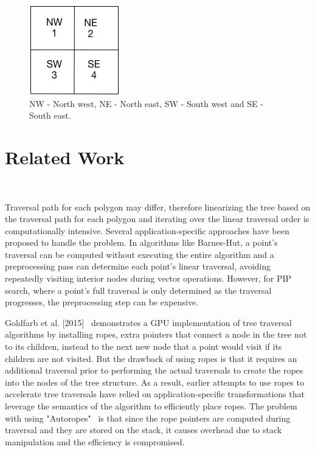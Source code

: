  \begin{figure}[H]    
 \centering
 \vspace{0.5in}
 \includegraphics[scale=0.8]{Images/Childquad}
 \vspace{0.5in}
 \caption{NW - North west, NE - North east, SW - South west and SE - South east.}
 \label{fig:Childquad}
 \end{figure}

\section{Related Work}~\label{sec:relatedWork}

Traversal path for each polygon may differ, therefore linearizing the tree based on the traversal path for each polygon and iterating over the linear traversal order is computationally intensive.
Several application-specific approaches have been proposed to handle the problem.
 In algorithms like Barnes-Hut,  a point's traversal can be computed without executing the entire algorithm and a preprocessing pass can determine each point's linear traversal, avoiding repeatedly visiting interior nodes during vector operations. However, for PIP search, where a point's full traversal is only determined as the traversal progresses, the preprocessing step can be expensive.
 
Goldfarb et al. [2015]~\cite{goldfarb13sc} demonstrates a GPU implementation of tree traversal algorithms by installing ropes, extra pointers that connect a node in the tree not to its children,  instead to the next new node that a point would visit if its children are not visited. But the drawback of using ropes is that it requires an additional traversal prior to performing the actual traversals to create the ropes into the nodes of the tree structure. As a result, earlier attempts to use ropes to accelerate tree traversals have relied on application-specific transformations that leverage the semantics of the algorithm to efficiently place ropes.
The problem with using "Autoropes"~\cite{goldfarb13sc} is that since the rope pointers are computed during traversal and they are stored on the stack, it causes overhead due to stack manipulation and the efficiency is compromised.

